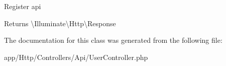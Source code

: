 Register api

\begin{DoxyReturn}{Returns}
\textbackslash{}\+Illuminate\textbackslash{}\+Http\textbackslash{}\+Response 
\end{DoxyReturn}


The documentation for this class was generated from the following file\+:\begin{DoxyCompactItemize}
\item 
app/\+Http/\+Controllers/\+Api/User\+Controller.\+php\end{DoxyCompactItemize}
